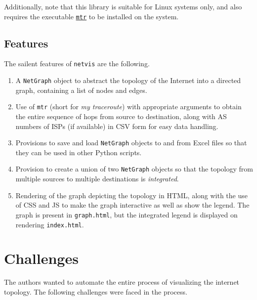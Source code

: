 \documentclass[journal,12pt,twocolumn]{IEEEtran}
\begin{document}
Additionally, note that this library is suitable for Linux systems only, and
also requires the executable
\href{https://linux.die.net/man/8/mtr}{\texttt{mtr}} to be installed on the
system.

\subsection{Features}

The sailent features of \texttt{netvis} are the following.
\begin{enumerate}
     \item A \texttt{NetGraph} object to abstract the topology of the Internet
     into a directed graph, containing a list of nodes and edges.
     \item Use of \texttt{mtr} (short for \emph{my traceroute}) with appropriate
     arguments to obtain the entire sequence of hops from source to destination,
     along with AS numbers of ISPs (if available) in CSV form for easy data
     handling.
     \item Provisions to save and load \texttt{NetGraph} objects to and from
     Excel files so that they can be used in other Python scripts.
     \item Provision to create a union of two \texttt{NetGraph} objects so that
     the topology from multiple sources to multiple destinations is
     \emph{integrated}.
     \item Rendering of the graph depicting the topology in HTML, along with the
     use of CSS and JS to make the graph interactive as well as show the legend.
     The graph is present in \texttt{graph.html}, but the integrated legend is
     displayed on rendering \texttt{index.html}.
\end{enumerate}

\section{Challenges}

The authors wanted to automate the entire process of visualizing the internet
topology. The following challenges were faced in the process.
\end{document}
